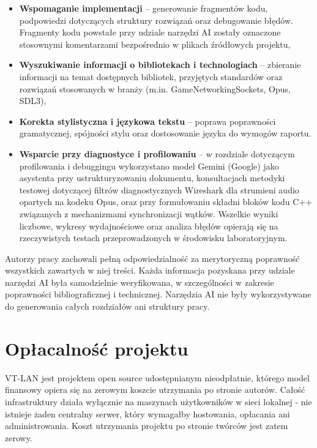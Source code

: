 \begin{itemize}
	\item \textbf{Wspomaganie implementacji} -- generowanie fragmentów kodu,
	podpowiedzi dotyczących struktury rozwiązań oraz debugowanie błędów.
	Fragmenty kodu powstałe przy udziale narzędzi AI zostały oznaczone
	stosownymi komentarzami bezpośrednio w plikach źródłowych projektu,
	
	\item \textbf{Wyszukiwanie informacji o bibliotekach i technologiach} --
	zbieranie informacji na temat dostępnych bibliotek, przyjętych standardów
	oraz rozwiązań stosowanych w branży (m.in. GameNetworkingSockets, Opus, SDL3),
	
	\item \textbf{Korekta stylistyczna i językowa tekstu} -- poprawa poprawności
	gramatycznej, spójności stylu oraz dostosowanie języka do wymogów raportu.
	
	\item \textbf{Wsparcie przy diagnostyce i profilowaniu} --
	w rozdziale dotyczącym profilowania i debuggingu wykorzystano model
	Gemini (Google) jako asystenta przy ustrukturyzowaniu dokumentu,
	konsultacjach metodyki testowej dotyczącej filtrów diagnostycznych
	Wireshark dla strumieni audio opartych na kodeku Opus, oraz przy
	formułowaniu składni bloków kodu C++ związanych z mechanizmami
	synchronizacji wątków. Wszelkie wyniki liczbowe, wykresy wydajnościowe
	oraz analiza błędów opierają się na rzeczywistych testach
	przeprowadzonych w środowisku laboratoryjnym.
\end{itemize}

Autorzy pracy zachowali pełną odpowiedzialność za merytoryczną poprawność
wszystkich zawartych w niej treści. Każda informacja pozyskana przy udziale
narzędzi AI była samodzielnie weryfikowana, w szczególności w zakresie
poprawności bibliograficznej i technicznej. Narzędzia AI nie były wykorzystywane
do generowania całych rozdziałów ani struktury pracy.

\section{Opłacalność projektu}

VT-LAN jest projektem open source udostępnianym nieodpłatnie, którego model
finansowy opiera się na zerowym koszcie utrzymania po stronie autorów.
Całość infrastruktury działa wyłącznie na maszynach użytkowników w sieci lokalnej
- nie istnieje żaden centralny serwer, który wymagałby hostowania, opłacania
ani administrowania. Koszt utrzymania projektu po stronie twórców jest zatem
zerowy.


